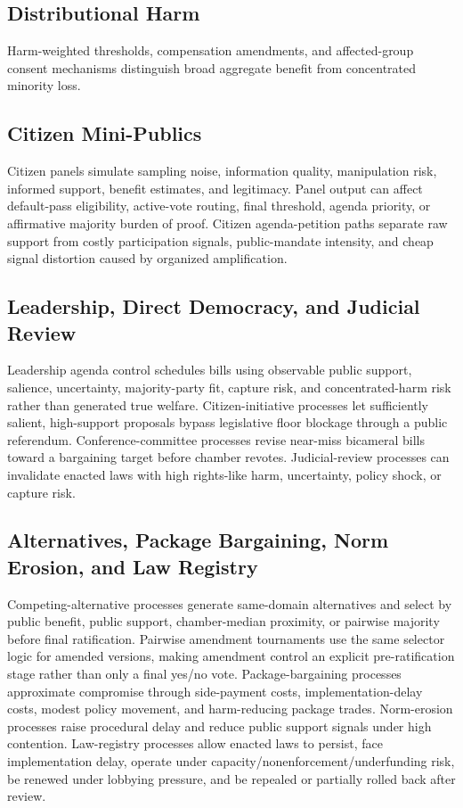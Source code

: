 \documentclass[manuscript,review,anonymous]{acmart}
\begin{document}
\subsection{Distributional Harm}

Harm-weighted thresholds, compensation amendments, and affected-group consent mechanisms distinguish broad aggregate benefit from concentrated minority loss.

\subsection{Citizen Mini-Publics}

Citizen panels simulate sampling noise, information quality, manipulation risk, informed support, benefit estimates, and legitimacy. Panel output can affect default-pass eligibility, active-vote routing, final threshold, agenda priority, or affirmative majority burden of proof. Citizen agenda-petition paths separate raw support from costly participation signals, public-mandate intensity, and cheap signal distortion caused by organized amplification.

\subsection{Leadership, Direct Democracy, and Judicial Review}

Leadership agenda control schedules bills using observable public support, salience, uncertainty, majority-party fit, capture risk, and concentrated-harm risk rather than generated true welfare. Citizen-initiative processes let sufficiently salient, high-support proposals bypass legislative floor blockage through a public referendum. Conference-committee processes revise near-miss bicameral bills toward a bargaining target before chamber revotes. Judicial-review processes can invalidate enacted laws with high rights-like harm, uncertainty, policy shock, or capture risk.

\subsection{Alternatives, Package Bargaining, Norm Erosion, and Law Registry}

Competing-alternative processes generate same-domain alternatives and select by public benefit, public support, chamber-median proximity, or pairwise majority before final ratification. Pairwise amendment tournaments use the same selector logic for amended versions, making amendment control an explicit pre-ratification stage rather than only a final yes/no vote. Package-bargaining processes approximate compromise through side-payment costs, implementation-delay costs, modest policy movement, and harm-reducing package trades. Norm-erosion processes raise procedural delay and reduce public support signals under high contention. Law-registry processes allow enacted laws to persist, face implementation delay, operate under capacity/nonenforcement/underfunding risk, be renewed under lobbying pressure, and be repealed or partially rolled back after review.
\end{document}
